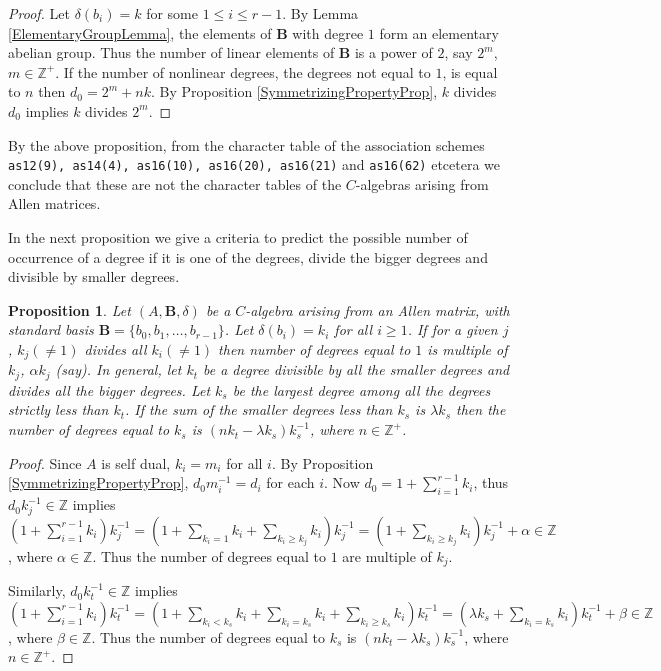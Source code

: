 \documentclass[12pt]{amsart}
\newtheorem{prop}[thm]{Proposition}
\begin{document}
\begin{proof} Let $\delta(b_i) =k$ for some $1\leq i\leq r-1$. By Lemma \ref{ElementaryGroupLemma}, the elements of ${{\mathbf B}}$ with degree $1$ form an elementary abelian group. Thus the number of linear elements of ${{\mathbf B}}$ is a power of $2$, say $2^m$, $m\in {{\mathbb Z}}^+$. If the number of nonlinear degrees, the degrees not equal to $1$, is equal to $n$ then $d_0=2^m+nk$. By Proposition \ref{SymmetrizingPropertyProp}, $k$ divides $d_0$ implies $k$ divides $2^m$.
\end{proof}

By the above proposition,  from the character table of the association schemes {\tt as12(9), as14(4), as16(10), as16(20), as16(21)} and {\tt as16(62)} etcetera we conclude that these are not the character tables of the $C$-algebras arising from Allen matrices.

In the next proposition we give a criteria to predict the possible number of occurrence of a degree if it is one of the degrees, divide the bigger degrees and  divisible by smaller degrees.

\begin{prop}\label{PredictionOfDegreesAllenCaseProp}Let $(A,{{\mathbf B}}, \delta)$ be a $C$-algebra arising from an Allen matrix, with standard  basis ${{\mathbf B}}=\{b_0,b_1,\hdots, b_{r-1}\}$. Let $\delta(b_i)=k_i$ for all $i\geq 1$.  If for a given $j$, $k_j(\neq 1)$ divides all $k_i(\neq 1)$ then number of degrees equal to $1$ is  multiple of $k_j$, $\alpha k_j$ (say).
In general, let $k_t$ be a degree divisible by all the smaller degrees and divides all the bigger degrees. Let $k_s$ be the largest degree among all the degrees strictly less than $k_t$. If the sum of the smaller degrees less than $k_s$ is $\lambda k_s$ then the number of degrees equal to $k_s$ is  $(nk_t-\lambda k_s){k^{-1}_s}$, where $n\in {{\mathbb Z}}^+$. 
\end{prop}

\begin{proof}
Since $A$ is self dual, $k_i=m_i$ for all $i$. By Proposition \ref{SymmetrizingPropertyProp},  ${d_0}{m^{-1}_i}=d_i$ for each $i$. Now $d_0=1+\sum\limits^{r-1}_{i=1}k_i$, thus ${d_0}{k^{-1}_j} \in {{\mathbb Z}}$ implies $ ({1+\sum\limits^{r-1}_{i=1}k_i}){k^{-1}_j}
=({1+\sum\limits^{}_{k_i=1}k_i+\sum\limits^{}_{k_i\geq k_j}k_i}){k^{-1}_j}
=({1+\sum\limits^{}_{k_i\geq k_j}k_i}){k^{-1}_j}+ \alpha
 \in {{\mathbb Z}}$, where $\alpha\in {{\mathbb Z}}$. Thus the number of degrees equal to $1$ are multiple of $k_j$.

Similarly,  ${d_0}{k^{-1}_t} \in {{\mathbb Z}}$ implies $ ({1+\sum\limits^{r-1}_{i=1}k_i}){k^{-1}_t}
=({1+\sum\limits^{}_{k_i<k_s}k_i+\sum\limits^{}_{k_i=k_s}k_i
+\sum\limits^{}_{k_i\geq k_s}k_i}){k^{-1}_t}
=(\lambda k_s +\sum\limits^{}_{k_i=k_s}k_i){k^{-1}_t}+ \beta
 \in {{\mathbb Z}}$, where $\beta\in {{\mathbb Z}}$. Thus the number of degrees equal to $k_s$ is  $(nk_t-\lambda k_s){k^{-1}_s}$, where $n\in {{\mathbb Z}}^+$.
\end{proof}
\end{document}
